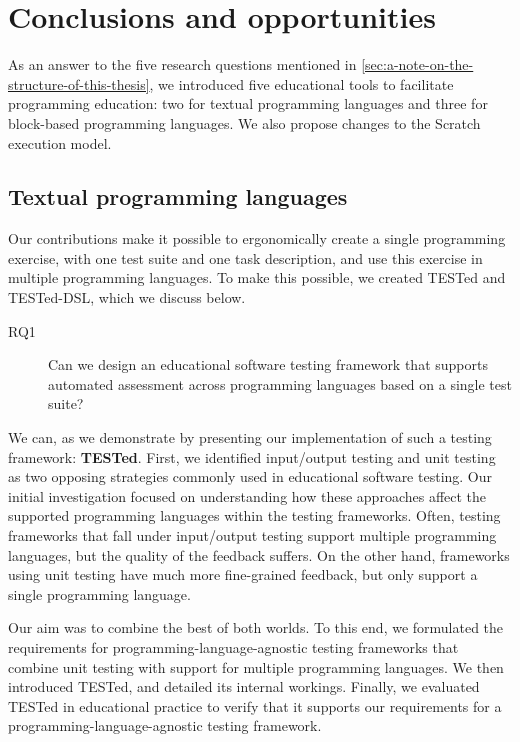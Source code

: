 \documentclass[main]{subfiles}
\begin{document}
\chapter{Conclusions and opportunities}\label{ch:conclusions-and-opportunities}

As an answer to the five research questions mentioned in \cref{sec:a-note-on-the-structure-of-this-thesis},
we introduced five educational tools to facilitate programming education:
two for textual programming languages and three for block-based programming languages.
We also propose changes to the Scratch execution model.

\section{Textual programming languages}\label{sec:for-textual-programming-languages}

Our contributions make it possible to ergonomically create a single programming exercise, with one test suite and one task description, and use this exercise in multiple programming languages.
To make this possible, we created TESTed and TESTed-DSL, which we discuss below.

\begin{description}
    \item[RQ1] Can we design an educational software testing framework that supports automated assessment across programming languages based on a single test suite?
\end{description}

We can, as we demonstrate by presenting our implementation of such a testing framework: \textbf{TESTed}.
First, we identified input/output testing and unit testing as two opposing strategies commonly used in educational software testing.
Our initial investigation focused on understanding how these approaches affect the supported programming languages within the testing frameworks.
Often, testing frameworks that fall under input/output testing support multiple programming languages, but the quality of the feedback suffers.
On the other hand, frameworks using unit testing have much more fine-grained feedback, but only support a single programming language.

Our aim was to combine the best of both worlds.
To this end, we formulated the requirements for programming-language-agnostic testing frameworks that combine unit testing with support for multiple programming languages.
We then introduced TESTed, and detailed its internal workings.
Finally, we evaluated TESTed in educational practice to verify that it supports our requirements for a programming-language-agnostic testing framework.
\end{document}
